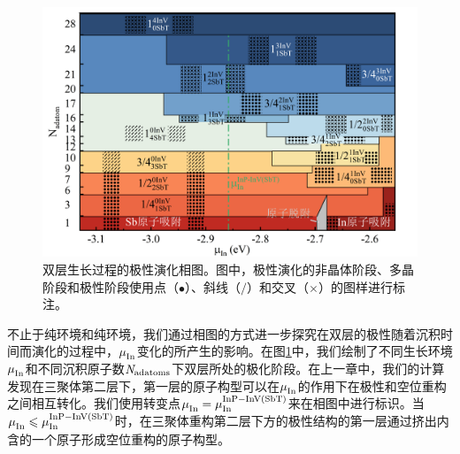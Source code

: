 \begin{figure}[htb]
    \includegraphics{pic/IS_DFT_2LInSb_partPhase.png}
    \caption{双层生长过程的极性演化相图。图中，极性演化的非晶体阶段、多晶阶段和极性阶段使用点（$\bullet$）、斜线（$/ $）和交叉（$\times$）的图样进行标注。}
    \label{fig:IS_DFT_2LInSb_partPhase}
\end{figure}

不止于纯环境和纯环境，我们通过相图的方式进一步探究在双层的极性随着沉积时间而演化的过程中，$\it \mu_{\rm In}^{\rm } \it$变化的所产生的影响。在图\ref{fig:IS_DFT_2LInSb_partPhase}中，我们绘制了不同生长环境$\it \mu_{\rm In}^{\rm } \it$和不同沉积原子数$\it N_{\rm adatoms} \it$下双层所处的极化阶段。在上一章中，我们的计算发现在三聚体第二层下，第一层的原子构型可以在$\it \mu_{\rm In}^{\rm } \it$的作用下在极性和空位重构之间相互转化。我们使用转变点$\it \mu_{\rm In}^{\rm } \it=\it \mu_{\rm In}^{\rm InP-InV\left(SbT\right)} \it$来在相图中进行标识。当$\it \mu_{\rm In}^{\rm } \it \leqslant \it \mu_{\rm In}^{\rm InP-InV\left(SbT\right)} \it$时，在三聚体重构第二层下方的极性结构的第一层通过挤出内含的一个原子形成空位重构的原子构型。

